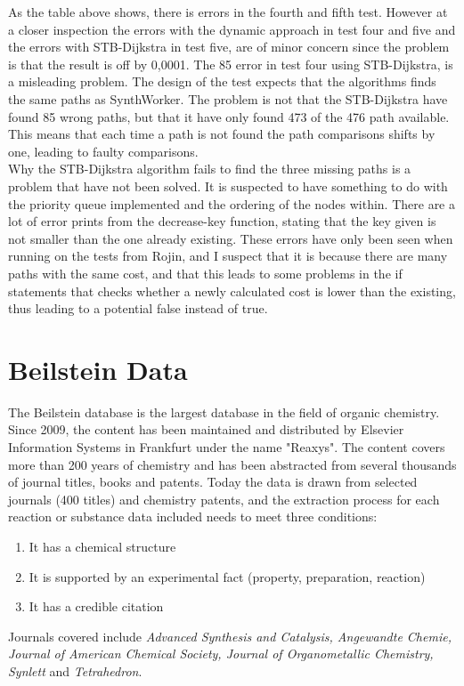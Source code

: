 \documentclass[a4paper,10pt,titlepage]{paper}
\begin{document}
As the table above shows, there is errors in the fourth and fifth test. However at a closer inspection the errors with the dynamic approach in test four and five and the errors with STB-Dijkstra in test five, are of minor concern since the problem is that the result is off by 0,0001. The 85 error in test four using STB-Dijkstra, is a misleading problem. The design of the test expects that the algorithms finds the same paths as SynthWorker. The problem is not that the STB-Dijkstra have found 85 wrong paths, but that it have only found 473 of the 476 path available. This means that each time a path is not found the path comparisons shifts by one, leading to faulty comparisons.\\

Why the STB-Dijkstra algorithm fails to find the three missing paths is a problem that have not been solved. It is suspected to have something to do with the priority queue implemented and the ordering of the nodes within. There are a lot of error prints from the decrease-key function, stating that the key given is not smaller than the one already existing. These errors have only been seen when running on the tests from Rojin, and I suspect that it is because there are many paths with the same cost, and that this leads to some problems in the if statements that checks whether a newly calculated cost is lower than the existing, thus leading to a potential false instead of true.

\section{Beilstein Data}
The Beilstein database is the largest database in the field of organic chemistry. Since 2009, the content has been maintained and distributed by Elsevier Information Systems in Frankfurt under the name "Reaxys".
The content covers more than 200 years of chemistry and has been abstracted from several thousands of journal titles, books and patents. Today the data is drawn from selected journals (400 titles) and chemistry patents, and the extraction process for each reaction or substance data included needs to meet three conditions:
\begin{enumerate}
\item
It has a chemical structure
\item
It is supported by an experimental fact (property, preparation, reaction)
\item
It has a credible citation
\end{enumerate}
Journals covered include \textit{Advanced Synthesis and Catalysis, Angewandte Chemie, Journal of American Chemical Society, Journal of Organometallic Chemistry, Synlett} and \textit{Tetrahedron}. \cite{WikiReaxys}\cite{WikiBeilstein}
\end{document}
